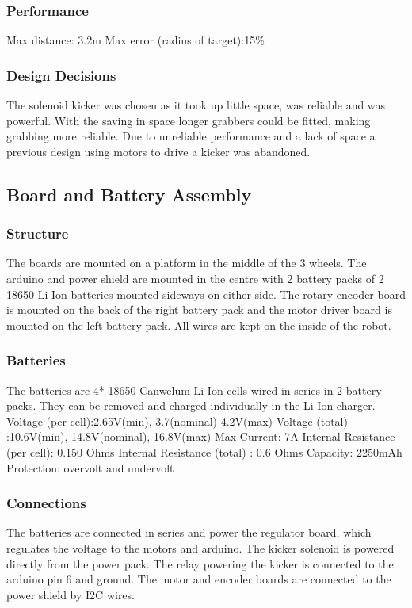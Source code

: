 \subsubsection{Performance}
Max distance: 3.2m 
Max error (radius of target):15\%


\subsubsection{Design Decisions}
The solenoid kicker was chosen as it took up little space, was reliable and was powerful. With the saving in space longer grabbers could be fitted, making grabbing more reliable. Due to unreliable performance and a lack of space a previous design using motors to drive a kicker was abandoned.


\subsection{Board and Battery Assembly}
\subsubsection{Structure}
The boards are mounted on a platform in the middle of the 3 wheels. The arduino and power
shield are mounted in the centre with 2 battery packs of 2 18650 Li-Ion batteries mounted sideways on either side. The rotary encoder board is
mounted on the back of the right battery pack and the motor driver board is mounted
on the left battery pack. All wires are kept on the inside of the robot.

\subsubsection{Batteries}
The batteries are 4* 18650 Canwelum Li-Ion cells wired in series in 2 battery packs. They can be removed and charged individually in the Li-Ion charger.
	Voltage (per cell):2.65V(min), 3.7(nominal) 4.2V(max)
    Voltage (total)   :10.6V(min), 14.8V(nominal), 16.8V(max)
    Max Current: 7A
    Internal Resistance (per cell): 0.150 Ohms
    Internal Resistance (total)   : 0.6   Ohms
    Capacity: 2250mAh
	Protection: overvolt and undervolt   
    
\subsubsection{Connections}
The batteries are connected in series and power the regulator board, which regulates the voltage to the motors and arduino. The kicker solenoid is powered directly from the power pack. The relay powering the kicker is connected to the arduino pin 6 and ground. The motor and encoder boards are connected to the power shield by I2C wires. 
